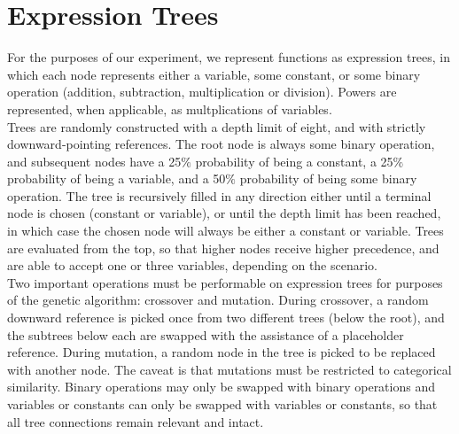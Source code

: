 
\section{Expression Trees}
\label{sec:background}

For the purposes of our experiment, we represent functions as expression
trees, in which each node represents either a variable, some constant, or
some binary operation (addition, subtraction, multiplication or division). Powers
are represented, when applicable, as multplications of variables. \\

Trees are randomly constructed with a depth limit of eight, and with strictly
downward-pointing references. The root node is always some binary operation,
and subsequent nodes have a 25$\%$ probability of being a constant, a 25$\%$ probability
of being a variable, and a 50$\%$ probability of being some binary operation. The tree is
recursively filled in any direction either until a terminal node is chosen (constant or variable),
or until the depth limit has been reached, in which case the chosen node will always
be either a constant or variable. Trees are evaluated from the top, so that higher nodes
receive higher precedence, and are able to accept one or three variables, depending
on the scenario. \\

Two important operations must be performable on expression trees for purposes of the
genetic algorithm: crossover and mutation. During crossover, a random downward reference
is picked once from two different trees (below the root), and the subtrees below each are
swapped with the assistance of a placeholder reference. During mutation, a random node in
the tree is picked to be replaced with another node. The caveat is that mutations must
be restricted to categorical similarity. Binary operations may only be swapped with binary
operations and variables or constants can only be swapped with variables or constants, so
that all tree connections remain relevant and intact. \\